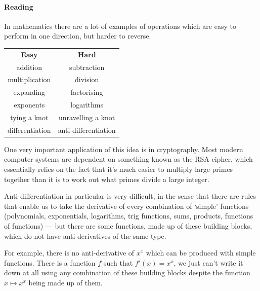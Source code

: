 \paragraph{Reading}
In mathematics there are a lot of examples of operations which are easy to perform
in one direction, but harder to reverse.

\begin{center}
  \begin{tabular}{c|c}
    \textbf{Easy} & \textbf{Hard}\\
    addition & subtraction\\
    multiplication & division\\
    expanding & factorising\\
    exponents & logarithms\\
    tying a knot & unravelling a knot\\
    differentiation & anti-differentiation
  \end{tabular}
\end{center}

One very important application of this idea is in cryptography. Most modern computer
systems are dependent on something known as the RSA cipher, which essentially relies
on the fact that it's much easier to multiply large primes together than it is to
work out what primes divide a large integer.

Anti-differentiation in particular is very difficult, in the sense that there are
rules that enable us to take the derivative of every combination of `simple' functions
(polynomials, exponentials, logarithms, trig functions, sums, products, functions of
functions) --- but there are some functions, made up of these building blocks, which
do not have anti-derivatives of the same type.

For example, there is no anti-derivative of $ x^x $ which can be produced with simple
functions. There is a function $ f $ such that $ f'(x) = x^x $, we just can't write it
down at all using any combination of these building blocks despite the function $ x \mapsto x^x $
being made up of them.

